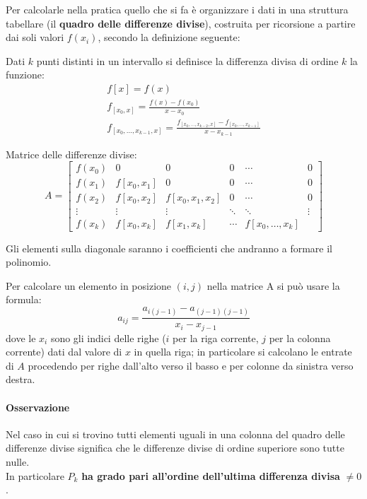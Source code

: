 \documentclass[12pt,a4paper,]{report}
\begin{document}
Per calcolarle nella pratica quello che si fa è organizzare i dati in una struttura tabellare (il \textbf{quadro delle differenze divise}), costruita per ricorsione a partire dai soli valori $f(x_i)$, secondo la definizione seguente:
\begin{definizione}
    Dati $k$ punti distinti in un intervallo si definisce la differenza divisa di ordine $k$ la funzione:
    \[
    \begin{array}{l}
         f[x]=f(x)\\
        f_{[x_0,x]} = \frac{f(x) - f(x_0)}{x-x_0}\\
        f_{[x_0,...,x_{k-1},x]} = \frac{f_{[x_0,...,x_{k-2},x]} - f_{[x_0,...,x_{k-1}]}}{x-x_{k-1}}
    \end{array}
    \]
\end{definizione}
\noindent
Matrice delle differenze divise:
\[
A =
\begin{bmatrix}
f(x_0) & 0 & 0 & 0 & \cdots & 0 \\
f(x_1) & f[x_0, x_1] & 0 & 0 & \cdots & 0 \\
f(x_2) & f[x_0, x_2] & f[x_0, x_1, x_2] & 0 & \cdots & 0 \\
\vdots & \vdots & \vdots & \ddots & \ddots & \vdots \\
f(x_k) & f[x_0, x_k] & f[x_1, x_k] & \cdots & f[x_0, \dots, x_k]
\end{bmatrix}
\]
\begin{nota}
    Gli elementi sulla diagonale saranno i coefficienti che andranno a formare il polinomio.
\end{nota}
\noindent
Per calcolare un elemento in posizione $(i,j)$ nella matrice A si può usare la formula:
\[
\boxed{a_{ij}=\frac{a_{i(j-1)}-a_{(j-1)(j-1)}}{x_i - x_{j-1}}}
\]
dove le $x_i$ sono gli indici delle righe ($i$ per la riga corrente, $j$ per la colonna corrente) dati dal valore di $x$ in quella riga; in particolare si calcolano le entrate di $A$ procedendo per righe dall'alto verso il basso e per colonne da sinistra verso destra.

\paragraph{Osservazione}
Nel caso in cui si trovino tutti elementi uguali in una colonna del quadro delle differenze divise significa che le differenze divise di ordine superiore sono tutte nulle.\\
In particolare $P_k$ \textbf{ha grado pari all'ordine dell'ultima differenza divisa} $\ne 0$.
\end{document}
